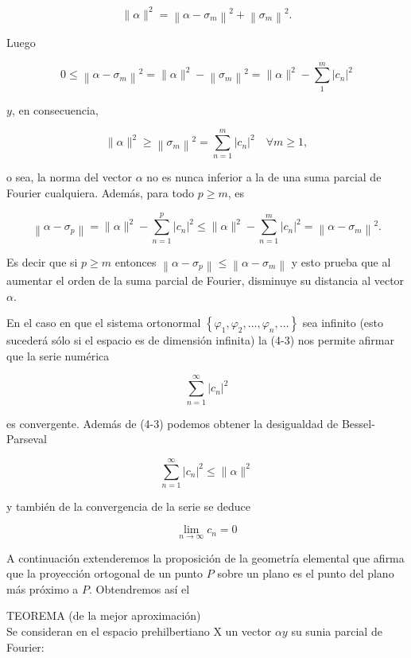 \documentclass[10pt]{article}
\theoremstyle{plain}
\theoremstyle{definition}
\theoremstyle{remark}
\begin{document}
$$
\|\alpha\|^{2}=\left\|\alpha-\sigma_{m}\right\|^{2}+\left\|\sigma_{m}\right\|^{2} .
$$

Luego


\begin{equation*}
0 \leqslant\left\|\alpha-\sigma_{m}\right\|^{2}=\|\alpha\|^{2}-\left\|\sigma_{m}\right\|^{2}=\|\alpha\|^{2}-\sum_{1}^{m}\left|c_{n}\right|^{2} \tag{4-2}
\end{equation*}


$y$, en consecuencia,


\begin{equation*}
\|\alpha\|^{2} \geqslant\left\|\sigma_{m}\right\|^{2}=\sum_{n=1}^{m}\left|c_{n}\right|^{2} \quad \forall m \geqslant 1, \tag{4-3}
\end{equation*}


o sea, la norma del vector $\alpha$ no es nunca inferior a la de una suma parcial de Fourier cualquiera. Además, para todo $p \geqslant m$, es

$$
\left\|\alpha-\sigma_{p}\right\|=\|\alpha\|^{2}-\sum_{n=1}^{p}\left|c_{n}\right|^{2} \leqslant\|\alpha\|^{2}-\sum_{n=1}^{m}\left|c_{n}\right|^{2}=\left\|\alpha-\sigma_{m}\right\|^{2} .
$$

Es decir que si $p \geqslant m$ entonces $\left\|\alpha-\sigma_{p}\right\| \leqslant\left\|\alpha-\sigma_{m}\right\|$ y esto prueba que al aumentar el orden de la suma parcial de Fourier, disminuye su distancia al vector $\alpha$.

En el caso en que el sistema ortonormal $\left\{\varphi_{1}, \varphi_{2}, \ldots, \varphi_{n}, \ldots\right\}$ sea infinito (esto sucederá sólo si el espacio es de dimensión infinita) la (4-3) nos permite afirmar que la serie numérica

$$
\sum_{n=1}^{\infty}\left|c_{n}\right|^{2}
$$

es convergente. Además de (4-3) podemos obtener la desigualdad de Bessel-Parseval

$$
\sum_{n=1}^{\infty}\left|c_{n}\right|^{2} \leqslant\|\alpha\|^{2}
$$

y también de la convergencia de la serie se deduce

$$
\lim _{n \rightarrow \infty} c_{n}=0
$$

A continuación extenderemos la proposición de la geometría elemental que afirma que la proyección ortogonal de un punto $P$ sobre un plano es el punto del plano más próximo a $P$. Obtendremos así el

TEOREMA (de la mejor aproximación)\\
Se consideran en el espacio prehilbertiano X un vector $\alpha y$ su sunia parcial de Fourier:
\end{document}

